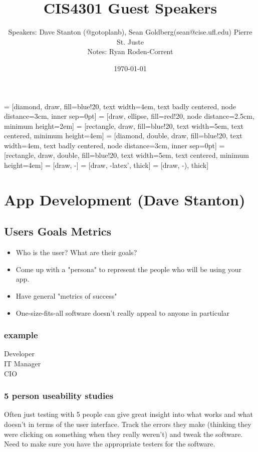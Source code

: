 \documentclass[12pt]{article}
\title{CIS4301 Guest Speakers}
\author{
  Speakers: Dave Stanton (@gotoplanb),
  Sean Goldberg(sean@cise.ufl.edu)
  Pierre St. Juste\\
  Notes: Ryan Roden-Corrent
}
\date{\today}
\begin{document}
\setlength\parindent{0pt}
 = [diamond, draw, fill=blue!20, text width=4em,
  text badly centered, node distance=3cm, inner sep=0pt]
 = [draw, ellipse, fill=red!20, node distance=2.5cm,
  minimum height=2em]
 = [rectangle, draw, fill=blue!20, text width=5em,
  text centered, minimum height=4em]
 = [diamond, double, draw, fill=blue!20, text width=4em,
  text badly centered, node distance=3cm, inner sep=0pt]
 = [rectangle, draw, double, fill=blue!20, text width=5em,
  text centered, minimum height=4em]
 = [draw, -]
 = [draw, -latex', thick]
 = [draw, -), thick]
\maketitle

\section{App Development (Dave Stanton)}
\subsection{Users Goals Metrics}
\begin{itemize}
  \item Who is the user? What are their goals?
  \item Come up with a "persona" to represent the people who will
    be using your app.
  \item Have general "metrics of success"
  \item One-size-fits-all software doesn't really appeal to anyone in particular
\end{itemize}

\subsubsection{example}
\begin{description}
  \item[Developer]
  \item[IT Manager]
  \item[CIO]
\end{description}

\subsubsection{5 person useability studies}
Often just testing with 5 people can give great insight into what works and
what doesn't in terms of the user interface. Track the errors they make
(thinking they were clicking on something when they really weren't) and tweak
the software. Need to make sure you have the appropriate testers for the
software.
\end{document}
